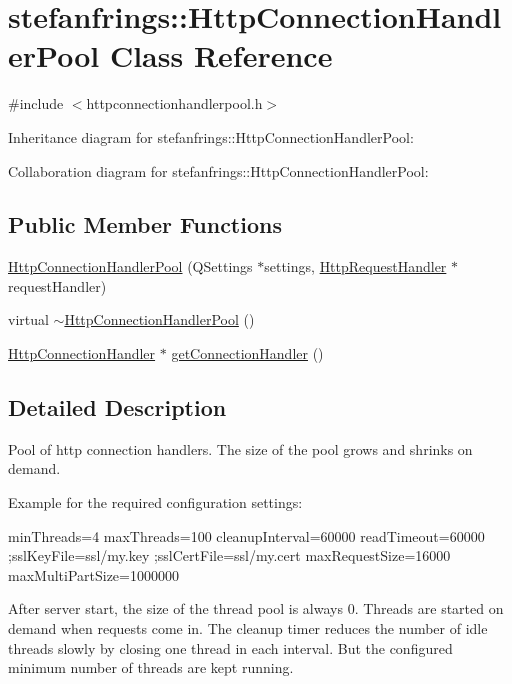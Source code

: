 \hypertarget{classstefanfrings_1_1_http_connection_handler_pool}{}\section{stefanfrings\+:\+:Http\+Connection\+Handler\+Pool Class Reference}
\label{classstefanfrings_1_1_http_connection_handler_pool}


{\ttfamily \#include $<$httpconnectionhandlerpool.\+h$>$}



Inheritance diagram for stefanfrings\+:\+:Http\+Connection\+Handler\+Pool\+:


Collaboration diagram for stefanfrings\+:\+:Http\+Connection\+Handler\+Pool\+:
\subsection*{Public Member Functions}
\begin{DoxyCompactItemize}
\item 
\mbox{\hyperlink{classstefanfrings_1_1_http_connection_handler_pool_a0e0873de42ccc13bf08eaa3b845c8592}{Http\+Connection\+Handler\+Pool}} (Q\+Settings $\ast$settings, \mbox{\hyperlink{classstefanfrings_1_1_http_request_handler}{Http\+Request\+Handler}} $\ast$request\+Handler)
\item 
virtual \mbox{\hyperlink{classstefanfrings_1_1_http_connection_handler_pool_a2473cc5157bd6546e9acd0df14c29637}{$\sim$\+Http\+Connection\+Handler\+Pool}} ()
\item 
\mbox{\hyperlink{classstefanfrings_1_1_http_connection_handler}{Http\+Connection\+Handler}} $\ast$ \mbox{\hyperlink{classstefanfrings_1_1_http_connection_handler_pool_aa7d15239af996e1989960e9f09409bc2}{get\+Connection\+Handler}} ()
\end{DoxyCompactItemize}


\subsection{Detailed Description}
Pool of http connection handlers. The size of the pool grows and shrinks on demand. 

Example for the required configuration settings\+: {\ttfamily 
\begin{DoxyPre}
minThreads=4
maxThreads=100
cleanupInterval=60000
readTimeout=60000
;sslKeyFile=ssl/my.key
;sslCertFile=ssl/my.cert
maxRequestSize=16000
maxMultiPartSize=1000000
\end{DoxyPre}
} After server start, the size of the thread pool is always 0. Threads are started on demand when requests come in. The cleanup timer reduces the number of idle threads slowly by closing one thread in each interval. But the configured minimum number of threads are kept running. 


